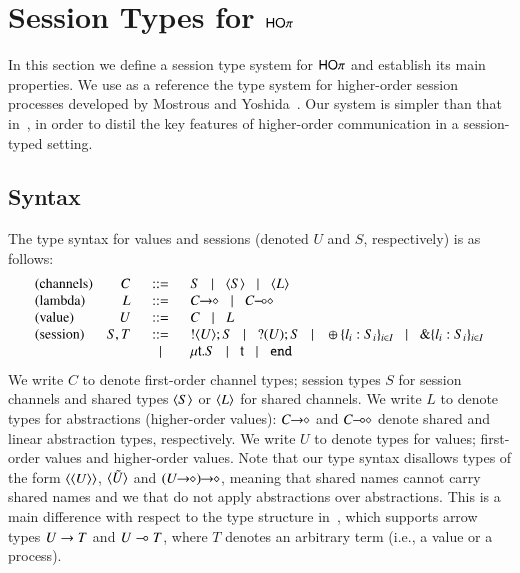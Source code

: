 \section{Session Types for $\mathsf{HO}\pi$}
\label{s:types}

In this section we define a session type system for
$\mathsf{HO}\pi$ and establish its main properties. We use as
a reference the type system for higher-order session processes 
developed by Mostrous and Yoshida~\cite{tlca07}.
Our system is simpler than that in~\cite{tlca07}, in order to distil the key
features of higher-order communication in a session-typed setting.


\subsection{Syntax}
The type syntax for values and sessions
(denoted $U$ and $S$, respectively) is as follows:
%
\[
\begin{array}{lrcl}
	\textrm{(channels)} & C & \bnfis &	S \bnfbar \chtype{S} \bnfbar \chtype{L}
	\\

	\textrm{(lambda)} & L & \bnfis &	\shot{C} \bnfbar \lhot{C}
	\\

	\textrm{(value)} & U & \bnfis &	C \bnfbar L 
	\\

	\textrm{(session)} & S,T & \bnfis & 	\btout{U} S \bnfbar \btinp{U} S
						\bnfbar \btsel{l_i:S_i}_{i \in I} \bnfbar \btbra{l_i:S_i}_{i \in I}\\
				&&\bnfbar&	\trec{t}{S} \bnfbar \vart{t}  \bnfbar \tinact
\end{array}
\]
%
\noi We write $C$ to denote first-order channel types; session types $S$
for session channels and shared types $\langle S \rangle$ or $\langle L \rangle$ 
for shared channels.
We write $L$ to denote types for abstractions (higher-order values): %
$C\!\! \rightarrow\!\! \diamond$ and $C\!\! \multimap\!\! \diamond$ denote
shared and linear abstraction types, respectively.
We write $U$ to denote types for values; first-order values and 
higher-order values.
Note that our type syntax disallows types of
the form $\langle \langle U \rangle \rangle$, $\langle \tilde{U} \rangle$
and $\shot{(\shot{U})}$,
meaning that shared names cannot carry shared names and
we that do not apply abstractions over abstractions.
This is a main difference with respect to the type structure 
in~\cite{tlca07}, which  supports arrow types 
$U \rightarrow T$ and 
$U \multimap T$, where $T$ denotes an arbitrary term 
(i.e., a value or a process).

